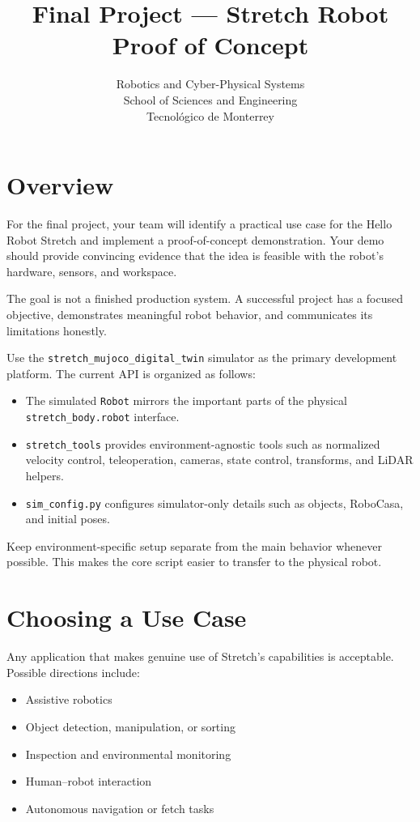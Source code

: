 \documentclass[11pt,a4paper]{article}
\title{\textbf{Final Project --- Stretch Robot Proof of Concept}}
\author{
    Robotics and Cyber-Physical Systems \\
    School of Sciences and Engineering \\
    Tecnol\'ogico de Monterrey
}
\date{}
\begin{document}
\maketitle

\section*{Overview}

For the final project, your team will identify a practical use case for the
Hello Robot Stretch and implement a proof-of-concept demonstration. Your demo
should provide convincing evidence that the idea is feasible with the robot's
hardware, sensors, and workspace.

The goal is not a finished production system. A successful project has a
focused objective, demonstrates meaningful robot behavior, and communicates
its limitations honestly.

Use the \texttt{stretch\_mujoco\_digital\_twin} simulator as the primary
development platform. The current API is organized as follows:

\begin{itemize}
    \item The simulated \texttt{Robot} mirrors the important parts of the
          physical \texttt{stretch\_body.robot} interface.
    \item \texttt{stretch\_tools} provides environment-agnostic tools such as
          normalized velocity control, teleoperation, cameras, state control,
          transforms, and LiDAR helpers.
    \item \texttt{sim\_config.py} configures simulator-only details such as
          objects, RoboCasa, and initial poses.
\end{itemize}

Keep environment-specific setup separate from the main behavior whenever
possible. This makes the core script easier to transfer to the physical robot.

\section*{Choosing a Use Case}

Any application that makes genuine use of Stretch's capabilities is
acceptable. Possible directions include:

\begin{itemize}
    \item Assistive robotics
    \item Object detection, manipulation, or sorting
    \item Inspection and environmental monitoring
    \item Human--robot interaction
    \item Autonomous navigation or fetch tasks
\end{itemize}
\end{document}
